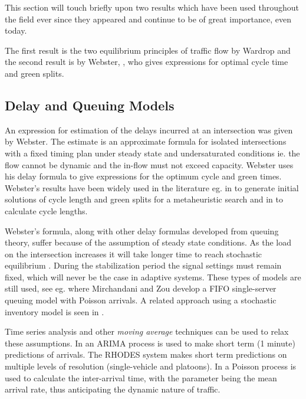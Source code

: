\label{sec:history}

This section will touch briefly upon two results which have been used
throughout the field ever since they appeared and continue to be of
great importance, even today.

The first result is the two equilibrium principles of traffic flow by
Wardrop \citet{Wardrop} and the second result is by Webster,
\citet{Webster}, who gives expressions for optimal cycle time and green
splits.

\subsection{Delay and Queuing Models}
\label{sec:webster}

An expression for estimation of the delays incurred at an intersection
was given by Webster. The estimate is an approximate formula for
isolated intersections with a fixed timing plan under steady state and
undersaturated conditions ie. the flow cannot be dynamic and the
in-flow must not exceed capacity.  Webster uses his delay formula to
give expressions for the optimum cycle and green times.  Webster's
results have been widely used in the literature eg. in \citet{1} to
generate initial solutions of cycle length and green splits for a
metaheuristic search and in \citet{30} to calculate cycle lengths.

Webster's formula, along with other delay formulas developed from
queuing theory, suffer because of the assumption of steady state
conditions. As the load on the intersection increases it will take
longer time to reach stochastic equilibrium
\citet{traffictheory}. During the stabilization period the signal
settings must remain fixed, which will never be the case in adaptive
systems. These types of models are still used, see eg. \citet{38} where
Mirchandani and Zou develop a FIFO single-server queuing model with
Poisson arrivals. A related approach using a stochastic inventory
model is seen in \citet{10}.

Time series analysis and other \textit{moving average} techniques can
be used to relax these assumptions. In \citet{shortpredict} an ARIMA
process is used to make short term (1 minute) predictions of
arrivals. The RHODES system \citet{44} makes short term predictions on
multiple levels of resolution (single-vehicle and platoons). In
\citet{1} a Poisson process is used to calculate the inter-arrival time,
with the parameter being the mean arrival rate, thus anticipating the
dynamic nature of traffic.

